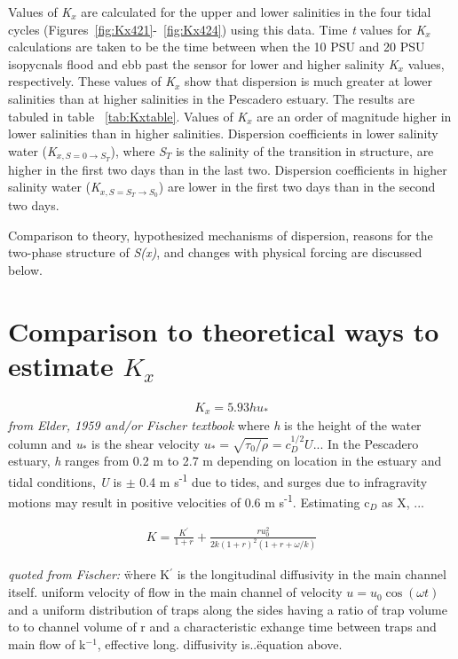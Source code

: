 Values of \emph{K$_x$} are calculated for the upper and lower salinities in the four tidal cycles (Figures~\ref{fig:Kx421}-~\ref{fig:Kx424}) using this data. Time \emph{t} values for \emph{K$_x$} calculations are taken to be the time between when the 10 PSU and 20 PSU isopycnals flood and ebb past the sensor for lower and higher salinity \emph{K$_x$} values, respectively. These values of \emph{K$_x$} show that dispersion is much greater at lower salinities than at higher salinities in the Pescadero estuary. The results are tabuled in table ~\ref{tab:Kxtable}. Values of \emph{K$_x$} are an order of magnitude higher in lower salinities than in higher salinities. Dispersion coefficients in lower salinity water (\emph{K$_{x,S=0 \rightarrow S_T}$}), where \emph{S$_T$} is the salinity of the transition in structure, are higher in the first two days than in the last two. Dispersion coefficients in higher salinity water (\emph{K$_{x,S=S_T \rightarrow S_0}$}) are lower in the first two days than in the second two days. 

Comparison to theory, hypothesized mechanisms of dispersion, reasons for the two-phase structure of \emph{S(x)}, and changes with physical forcing are discussed below. 

\section{Comparison to theoretical ways to estimate $K_x$}

\begin{eqnarray}
K_x = 5.93hu_* \label{eq:Kshear}
\end{eqnarray}
\emph{from Elder, 1959 and/or Fischer textbook} where \emph{h} is the height of the water column and \emph{u$_*$} is the shear velocity $u_*=\sqrt{\tau_0/\rho}=c_D^{1/2}U$... In the Pescadero estuary, \emph{h} ranges from 0.2 m to 2.7 m depending on location in the estuary and tidal conditions, \emph{U} is $\pm$ 0.4 m s\textsuperscript{-1} due to tides, and surges due to infragravity motions may result in positive velocities of 0.6 m s\textsuperscript{-1}. Estimating c$_D$ as X, ... 


\begin{eqnarray}
K = \frac{K^{'}}{1+r} + \frac{ru_0^2}{2k(1+r)^2(1+r+\omega / k)} \label{eq:KxOkubo}
\end{eqnarray}

\emph{quoted from Fischer:} \"where K$^{'}$ is the longitudinal diffusivity in the main channel itself. uniform velocity of flow in the main channel of velocity $u = u_0 \cos(\omega t)$ and a uniform distribution of traps along the sides having a ratio of trap volume to to channel volume of r and a characteristic exhange time between traps and main flow of k$^{-1}$, effective long. diffusivity is..\" equation above. 


